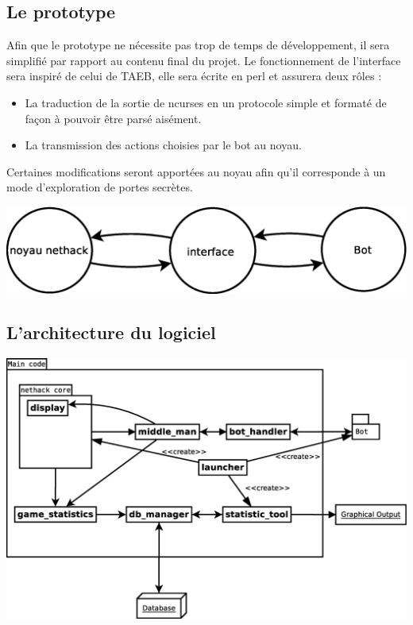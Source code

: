 \documentclass[12pt]{article}
\begin{document}
\subsection{Le prototype}
Afin que le prototype ne nécessite pas trop de temps de développement, il sera simplifié par rapport au contenu final du projet. Le fonctionnement de l'interface sera inspiré de celui de TAEB, elle sera écrite en perl et assurera deux rôles :
\begin{itemize}
\item La traduction de la sortie de ncurses en un protocole simple et formaté de façon à pouvoir être parsé aisément.
\item La transmission des actions choisies par le bot au noyau.
\end{itemize}
Certaines modifications seront apportées au noyau afin qu'il corresponde à un mode d'exploration de portes secrètes.

\begin{center}
  \includegraphics[width=180mm]{diagrammes/proto_archi.eps}
\end{center}

\subsection{L'architecture du logiciel}
\begin{center}
  \includegraphics[width=180mm]{diagrammes/new_archi.eps}
\end{center}
\end{document}
